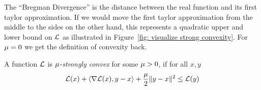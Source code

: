 The ``Bregman Divergence'' is the distance between the real function and its first
taylor approximation. If we would move the first taylor approximation from the
middle to the sides on the other hand, this represents a quadratic upper and lower
bound on \(\mathcal{L}\) as illustrated in Figure~\ref{fig: visualize strong
convexity}. For \(\mu=0\) we get the definition of convexity back.
\begin{definition}\label{def: strong convexity}
	A function \(\mathcal{L}\) is \(\mu\)-\emph{strongly convex} for some
	\(\mu>0\), if for all \(x,y\)
	\begin{align*}
		\mathcal{L}(x) + \langle \nabla \mathcal{L}(x), y-x\rangle + \frac{\mu}{2}\|y-x\|^2 \le \mathcal{L}(y)
	\end{align*}
\end{definition}

